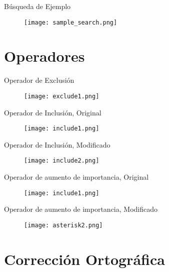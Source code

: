 \documentclass{beamer}
\begin{document}
\begin{frame}{Búsqueda de Ejemplo}
    \begin{figure}[h]
        \texttt{[image: sample\_search.png]}
    \end{figure}
\end{frame}

\section{Operadores}

\begin{frame}{Operador de Exclusión}
    \begin{figure}[h]
        \texttt{[image: exclude1.png]}
    \end{figure}
\end{frame}

\begin{frame}{Operador de Inclusión, Original}
    \begin{figure}[h]
        \texttt{[image: include1.png]}
    \end{figure}
\end{frame}

\begin{frame}{Operador de Inclusión, Modificado}
    \begin{figure}[h]
        \texttt{[image: include2.png]}
    \end{figure}
\end{frame}


\begin{frame}{Operador de aumento de importancia, Original}
    \begin{figure}
        \texttt{[image: include1.png]}
    \end{figure}
\end{frame}

\begin{frame}{Operador de aumento de importancia, Modificado}
    \begin{figure}
        \texttt{[image: asterisk2.png]}
    \end{figure}
\end{frame}

\section{Corrección Ortográfica}
\end{document}
